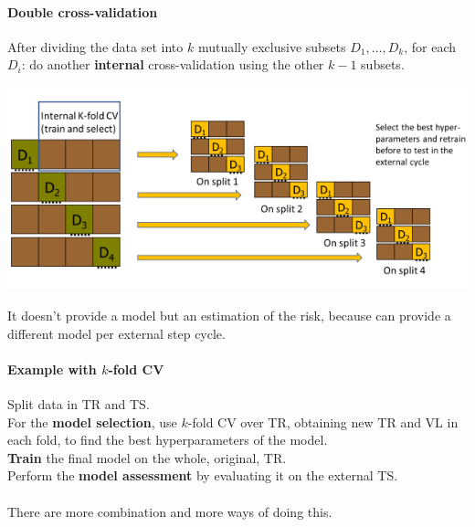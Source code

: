 \documentclass[10pt]{report}
\begin{document}
\paragraph{Double cross-validation} After dividing the data set into $k$ mutually exclusive subsets $D_1,\ldots, D_k$, for each $D_i$: do another \textbf{internal} cross-validation using the other $k-1$ subsets.
\begin{center}
	\includegraphics[scale=0.75]{13.png}
\end{center}
It doesn't provide a model but an estimation of the risk, because can provide a different model per external step cycle.
\paragraph{Example with $k$-fold CV} Split data in TR and TS.\\
For the \textbf{model selection}, use $k$-fold CV over TR, obtaining new TR and VL in each fold, to find the best hyperparameters of the model.\\
\textbf{Train} the final model on the whole, original, TR.\\
Perform the \textbf{model assessment} by evaluating it on the external TS.\\\\
There are more combination and more ways of doing this.
\end{document}
